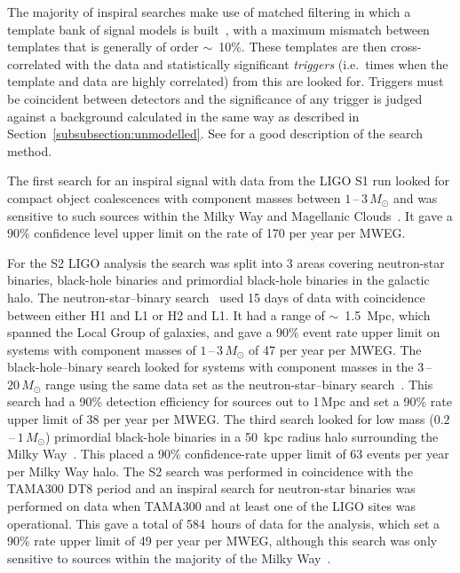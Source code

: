 The majority of inspiral searches make use of matched filtering in which a
template bank of signal models is built~\cite{Owen:1996, Owen:1999}, with a
maximum mismatch between templates that is generally of order $\sim$~10\%. These
templates are then cross-correlated with the data and statistically significant
\textit{triggers} (i.e.\ times when the template and data are highly correlated)
from this are looked for. Triggers must be coincident between detectors and the
significance of any trigger is judged against a background calculated in the
same way as described in Section~\ref{subsubsection:unmodelled}. See
\cite{Abbott:2005b} for a good description of the search method.


The first search for an inspiral signal with data from the LIGO S1 run looked
for compact object coalescences with component masses between $1$\,--\,$3\,M_{\odot}$
and was sensitive to such sources within the Milky Way and Magellanic
Clouds~\cite{Abbott:2004c}. It gave a 90\% confidence level upper
limit on the rate of 170 per year per MWEG.


For the S2 LIGO analysis the search was split into 3 areas covering neutron-star
binaries, black-hole binaries and primordial black-hole binaries in the galactic
halo. The neutron-star--binary search~\cite{Abbott:2005b} used 15 days of data
with coincidence between either H1 and L1 or H2 and L1. It had a range of
$\sim$~1.5~Mpc, which spanned the Local Group of galaxies, and gave a 90\% event
rate upper limit on systems with component masses of $1$\,--\,$3\,M_{\odot}$ of 47 per
year per MWEG. The black-hole--binary search looked for systems with component
masses in the $3$\,--\,$20\,M_{\odot}$ range using the same data set as the
neutron-star--binary search~\cite{Abbott:2006a}. This search had a 90\% detection
efficiency for sources out to 1\,Mpc and set a 90\% rate upper limit of 38 per
year per MWEG. The third search looked for low mass ($0.2$\,--\,$1\,M_{\odot}$)
primordial black-hole binaries in a 50~kpc radius halo surrounding the Milky
Way~\cite{Abbott:2005e}. This placed a 90\% confidence-rate upper limit of 63
events per year per Milky Way halo. The S2 search was performed in coincidence
with the TAMA300 DT8 period and an inspiral search for neutron-star binaries
was
performed on data when TAMA300 and at least one of the LIGO sites was
operational. This gave a total of 584~hours of data for the analysis, which set
a 90\% rate upper limit of 49 per year per MWEG, although this search was only
sensitive to sources within the majority of the Milky Way~\cite{Abbott:2006b}.


